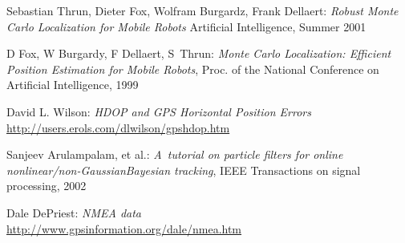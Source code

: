\clearpage
{}
\begin{thebibliography}{99}

Sebastian Thrun, Dieter Fox, Wolfram Burgardz, Frank Dellaert:
\emph{Robust Monte Carlo Localization for Mobile Robots}
Artificial Intelligence, Summer 2001

D Fox, W Burgardy, F Dellaert, S~Thrun:
{\em Monte Carlo Localization: Efficient Position Estimation for Mobile Robots},
Proc. of the National Conference on Artificial Intelligence, 1999

David L. Wilson:
\emph{HDOP and GPS Horizontal Position Errors} \\
\url{http://users.erols.com/dlwilson/gpshdop.htm}

Sanjeev Arulampalam, et al.:
{\em A~tutorial on particle filters for online nonlinear/non-GaussianBayesian tracking},
IEEE Transactions on signal processing, 2002

Dale DePriest:
\emph{NMEA data} \\
\url{http://www.gpsinformation.org/dale/nmea.htm}

\end{thebibliography}
